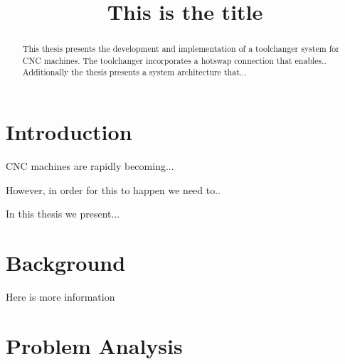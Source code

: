\documentclass[a4paper]{article}
\begin{document}
\title{This is the title}

\maketitle

\begin{abstract}
    This thesis presents the development and implementation of a toolchanger system for CNC machines. The toolchanger incorporates a hotswap connection that enables.. Additionally the thesis presents a system architecture that... 
\end{abstract}

\section{Introduction}
CNC machines are rapidly becoming... 

However, in order for this to happen we need to.. 

In this thesis we present... 


\section{Background}

Here is more information

\section{Problem Analysis}
\end{document}
